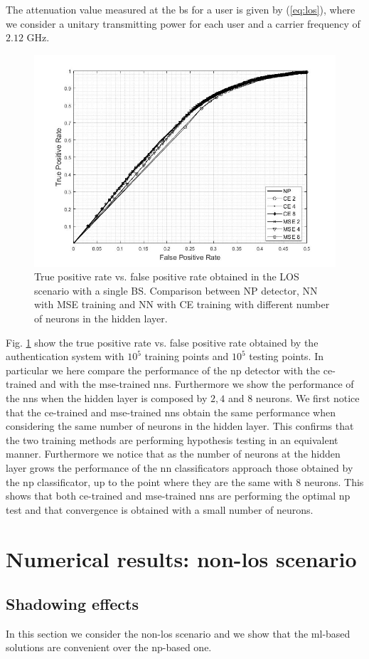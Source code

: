 \documentclass[draftcls,onecolumn,12pt]{IEEEtran}
\begin{document}
The attenuation value measured at the \ac{bs} for a user is given by (\ref{eq:los}), where we consider a unitary transmitting power for each user and a carrier frequency of $2.12$ GHz.
\begin{figure}[h]
    \centering
    \includegraphics[width=0.5\columnwidth]{mseVSce.jpg}
    \caption{True positive rate vs. false positive rate obtained in the LOS scenario with a single BS. Comparison between NP detector, NN with MSE training and NN with CE training with different number of neurons in the hidden layer.}
    \label{fig:ceVSmse}
\end{figure}

Fig. \ref{fig:ceVSmse} show the true positive rate vs. false positive rate obtained by the authentication system with $10^5$ training points and $10^5$ testing points. In particular we here compare the performance of the \ac{np} detector with the \ac{ce}-trained and with the \ac{mse}-trained \acp{nn}. Furthermore we show the performance of the \acp{nn} when the hidden layer is composed by $2,4 $ and $8$ neurons. We first notice that the \ac{ce}-trained and \ac{mse}-trained \acp{nn} obtain the same performance when considering the same number of neurons in the hidden layer. This confirms that the two training methods are performing hypothesis testing in an equivalent manner. Furthermore we notice that as the number of neurons at the hidden layer grows the performance of the \ac{nn} classificators approach those obtained by the \ac{np} classificator, up to the point where they are the same with $8$ neurons. This shows that both \ac{ce}-trained and \ac{mse}-trained \acp{nn} are performing the optimal \ac{np} test and that convergence is obtained with a small number of neurons.



\section{Numerical results: non-los scenario}\label{sec:res_nLos}
\subsection{Shadowing effects}\label{sec:shadow}
In this section we consider the non-\ac{los} scenario and we show that the \ac{ml}-based solutions are convenient over the \ac{np}-based one.
\end{document}
